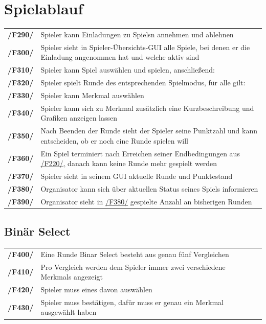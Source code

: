 \documentclass[a4paper]{scrreprt}
\begin{document}
    \section{Spielablauf} 
    \begin{tabularx}{\linewidth}{@{}>{\bfseries}l@{\hspace{.5em}}X@{}}
    \hypertarget{F290}{/F290/} & \Gls{Spieler} kann Einladungen zu \Glspl{Spiel}n annehmen und ablehnen \\
    \hypertarget{F300}{/F300/} & \Gls{Spieler} sieht in Spieler-Übersichts-GUI alle Spiele, bei denen er die Einladung angenommen hat und welche aktiv sind \\
    \hypertarget{F310}{/F310/} & \Gls{Spieler} kann \Gls{Spiel} auswählen und spielen, anschließend: \\
    \hypertarget{F320}{/F320/} & \Gls{Spieler} spielt Runde des entsprechenden \Gls{Spielmodus}, für alle gilt: \\
    \hypertarget{F330}{/F330/} & \Gls{Spieler} kann \Gls{Merkmal} auswählen \\
    \hypertarget{F340}{/F340/} & \Gls{Spieler} kann sich zu \Gls{Merkmal} zusätzlich eine Kurzbeschreibung und Grafiken anzeigen lassen \\
    \hypertarget{F350}{/F350/} & Nach Beenden der Runde sieht der \Gls{Spieler} seine Punktzahl und kann entscheiden, ob er noch eine Runde spielen will \\
	\hypertarget{F360}{/F360/} & Ein \Gls{Spiel} terminiert nach Erreichen seiner Endbedingungen aus \hyperlink{F220}{/F220/,} danach kann keine Runde mehr gespielt werden \\
    \hypertarget{F370}{/F370/} & \Gls{Spieler} sieht in seinem GUI aktuelle Runde und Punktestand \\
	\hypertarget{F380}{/F380/} & \Gls{Organisator} kann sich über aktuellen Status seines \Gls{Spiel}s informieren \\ %
    \hypertarget{F390}{/F390/} & \Gls{Organisator} sieht in \hyperlink{F380}{/F380/} gespielte Anzahl an bisherigen Runden
    \end{tabularx}
    
    \subsection{Binär Select}
    \begin{tabularx}{\linewidth}{@{}>{\bfseries}l@{\hspace{.5em}}X@{}}
        \hypertarget{F400}{/F400/} & Eine Runde \Gls{Binar Select} besteht aus genau fünf Vergleichen \\
    	\hypertarget{F410}{/F410/} & Pro Vergleich werden dem \Gls{Spieler} immer zwei verschiedene \Glspl{Merkmal} angezeigt \\
    	\hypertarget{F420}{/F420/} & \Gls{Spieler} muss eines davon auswählen \\
    	\hypertarget{F430}{/F430/} & \Gls{Spieler} muss bestätigen, dafür muss er genau ein \Gls{Merkmal} ausgewählt haben \\
    \end{tabularx}
\end{document}
